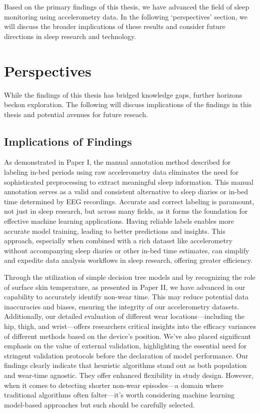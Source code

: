 \documentclass[
  10pt,
]{scrbook}
\begin{document}
Based on the primary findings of this thesis, we have advanced the field
of sleep monitoring using accelerometry data. In the following
`perspectives' section, we will discuss the broader implications of
these results and consider future directions in sleep research and
technology.

\hypertarget{perspectives}{%
\chapter{Perspectives}\label{perspectives}}

While the findings of this thesis has bridged knowledge gaps, further
horizons beckon exploration. The following will discuss implications of
the findings in this thesis and potential avenues for future reseach.

\hypertarget{implications-of-findings}{%
\section{Implications of Findings}\label{implications-of-findings}}

As demonstrated in Paper I, the manual annotation method described for
labeling in-bed periods using raw accelerometry data eliminates the need
for sophisticated preprocessing to extract meaningful sleep information.
This manual annotation serves as a valid and consistent alternative to
sleep diaries or in-bed time determined by EEG recordings. Accurate and
correct labeling is paramount, not just in sleep research, but across
many fields, as it forms the foundation for effective machine learning
applications. Having reliable labels enables more accurate model
training, leading to better predictions and insights. This approach,
especially when combined with a rich dataset like accelerometry without
accompanying sleep diaries or other in-bed time estimates, can simplify
and expedite data analysis workflows in sleep research, offering greater
efficiency.

Through the utilization of simple decision tree models and by
recognizing the role of surface skin temperature, as presented in Paper
II, we have advanced in our capability to accurately identify non-wear
time. This may reduce potential data inaccuracies and biases, ensuring
the integrity of our accelerometry datasets. Additionally, our detailed
evaluation of different wear locations---including the hip, thigh, and
wrist---offers researchers critical insights into the efficacy variances
of different methods based on the device's position. We've also placed
significant emphasis on the value of external validation, highlighting
the essential need for stringent validation protocols before the
declaration of model performance. Our findings clearly indicate that
heuristic algorithms stand out as both population and wear-time
agnostic. They offer enhanced flexibility in study design. However, when
it comes to detecting shorter non-wear episodes---a domain where
traditional algorithms often falter---it's worth considering machine
learning model-based approaches but such should be carefully selected.
\end{document}
